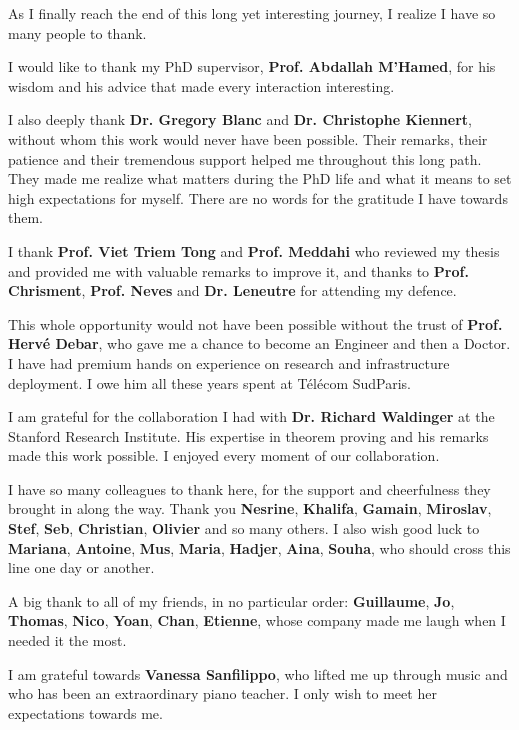 \documentclass[a4paper, 11pt]{report}
\theoremstyle{definition}
\begin{document}
As I finally reach the end of this long yet interesting journey, I realize I have so many people to thank.

I would like to thank my PhD supervisor, \textbf{Prof. Abdallah M'Hamed}, for his wisdom and his advice that made every interaction interesting.

I also deeply thank \textbf{Dr. Gregory Blanc} and \textbf{Dr. Christophe Kiennert}, without whom this work 
would never have been possible. Their remarks, their patience and their tremendous support helped me throughout this long path. They made me realize what matters during the PhD life and what it means to set high expectations for myself. There are no words for the gratitude I have towards them.

I thank \textbf{Prof. Viet Triem Tong} and \textbf{Prof. Meddahi} who reviewed my thesis and provided me with valuable remarks to improve it, and thanks to \textbf{Prof. Chrisment}, \textbf{Prof. Neves} and \textbf{Dr. Leneutre} for attending my defence.

This whole opportunity would not have been possible without the trust of \textbf{Prof. Herv\'e Debar}, who gave me a chance to become an Engineer and then a Doctor. I have had premium hands on experience on research and infrastructure deployment. I owe him all these years spent at T\'el\'ecom SudParis.

I am grateful for the collaboration I had with \textbf{Dr. Richard Waldinger} at the Stanford Research Institute. His expertise in theorem proving and his remarks made this work possible. I enjoyed every moment of our collaboration.

I have so many colleagues to thank here, for the support and cheerfulness they brought in along the way.
Thank you \textbf{Nesrine}, \textbf{Khalifa}, \textbf{Gamain}, \textbf{Miroslav}, \textbf{Stef}, \textbf{Seb}, \textbf{Christian}, \textbf{Olivier} and so many others. I also wish good luck to \textbf{Mariana}, \textbf{Antoine}, \textbf{Mus}, \textbf{Maria}, \textbf{Hadjer}, \textbf{Aina}, \textbf{Souha}, who should cross this line one day or another.

A big thank to all of my friends, in no particular order: \textbf{Guillaume}, \textbf{Jo}, \textbf{Thomas}, \textbf{Nico}, \textbf{Yoan}, \textbf{Chan}, \textbf{Etienne}, whose company made me laugh when I needed it the most. 

I am grateful towards \textbf{Vanessa Sanfilippo}, who lifted me up through music and who has been an extraordinary piano teacher. I only wish to meet her expectations towards me.
\end{document}
